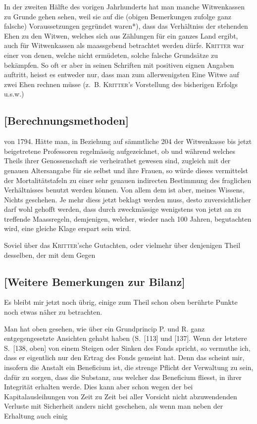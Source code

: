 \documentclass[12pt,a4paper]{article}
\begin{document}
In der zweiten Hälfte des vorigen Jahrhunderts hat man manche Witwenkassen zu Grunde gehen sehen, weil sie auf die (obigen Bemerkungen zufolge ganz falsche) Voraussetzungen gegründet waren{}*), dass das Verhältniss der stehenden Ehen zu den Witwen, welches sich aus Zählungen für ein ganzes Land ergibt, auch für Witwenkassen als maassgebend betrachtet werden dürfe. \textsc{Kritter} war einer von denen, welche nicht ermüdeten, solche falsche Grundsätze zu bekämpfen. So oft er aber in seinen Schriften mit positiven eignen Angaben auftritt, heisst es entweder nur, dass man zum allerwenigsten Eine Witwe auf zwei Ehen rechnen müsse (z.~B. \textsc{Kritter}'s Vorstellung des bisherigen Erfolgs u.s.w.)

\subsection*{[Berechnungsmethoden]}

von 1794. Hätte man, in Beziehung auf sämmtliche 204 der Witwenkasse bis jetzt beigetretene Professoren regelmässig aufgezeichnet, ob und während welches Theils ihrer Genossenschaft sie verheirathet gewesen sind, zugleich mit der genauen Altersangabe für sie selbst und ihre Frauen, so würde dieses vermittelst der Mortalitätstafeln zu einer sehr genauen indirecten Bestimmung des fraglichen Verhältnisses benutzt werden können. Von allem dem ist aber, meines Wissens, Nichts geschehen. Je mehr diess jetzt beklagt werden muss, desto zuversichtlicher darf wohl gehofft werden, dass durch zweckmässige wenigstens von jetzt an zu treffende Maassregeln, demjenigen, welcher, wieder nach 100 Jahren, begutachten wird, eine gleiche Klage erspart sein wird.

Soviel über das \textsc{Kritter}'sche Gutachten, oder vielmehr über denjenigen Theil desselben, der mit dem Gegen

\subsection*{[Weitere Bemerkungen zur Bilanz]}

Es bleibt mir jetzt noch übrig, einige zum Theil schon oben berührte Punkte noch etwas näher zu betrachten.

Man hat oben gesehen, wie über ein Grundprincip P. und R. ganz entgegengesetzte Ansichten gehabt haben (S.~[113] und [137]. Wenn der letztere S.~[138, oben] von einem Steigen oder Sinken des Fonds spricht, so vermuthe ich, dass er eigentlich nur den Ertrag des Fonds gemeint hat. Denn das scheint mir, insofern die Anstalt ein Beneficium ist, die strenge Pflicht der Verwaltung zu sein, dafür zu sorgen, dass die Substanz, aus welcher das Beneficium fliesst, in ihrer Integrität erhalten werde. Dies kann aber schon wegen der bei Kapitalausleihungen von Zeit zu Zeit bei aller Vorsicht nicht abzuwendenden Verluste mit Sicherheit anders nicht geschehen, als wenn man neben der Erhaltung auch einig
\end{document}
